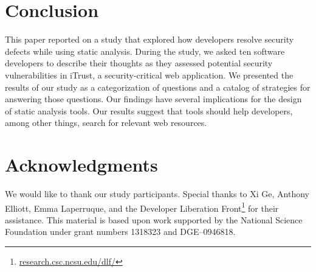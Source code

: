 \documentclass[10pt,journal,compsoc]{IEEEtran}
\newcommand{\blind}[1]{#1}
\begin{document}
\section{Conclusion}
\label{sec:concl}
This paper reported on a study that explored how developers resolve security defects while using static analysis.
During the study, we asked ten software developers to describe their thoughts as they assessed potential security vulnerabilities in iTrust, a security-critical web application.
We presented the results of our study as a categorization of questions and a catalog of strategies for answering those questions.
Our findings have several implications for the design of static analysis tools. 
Our results suggest that tools should help developers, among other things, search for relevant web resources.



\section{Acknowledgments}

We would like to thank our study participants. 
Special thanks to Xi Ge, Anthony Elliott, Emma Laperruque, and the Developer Liberation Front\footnote{\blind{\url{research.csc.ncsu.edu/dlf/}}} for their assistance. 
This material is based upon work supported by the National Science Foundation under grant numbers 1318323 and DGE--0946818.


%



\end{document}
